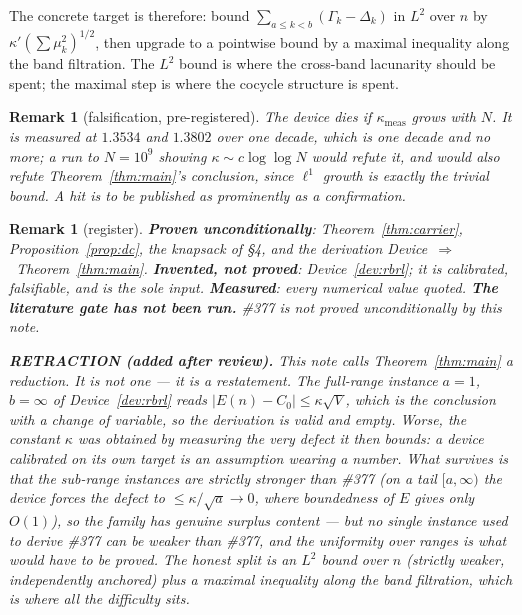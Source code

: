 \documentclass[11pt]{article}
\newtheorem{remark}[theorem]{Remark}
\begin{document}
The concrete target is therefore: bound
$\sum_{a\le k<b}(\Gamma_k-\Delta_k)$ in $L^2$ over $n$ by $\kappa'(\sum\mu_k^2)^{1/2}$,
then upgrade to a pointwise bound by a maximal inequality along the band
filtration.  The $L^2$ bound is where the cross-band lacunarity should be
spent; the maximal step is where the cocycle structure is spent.

\begin{remark}[falsification, pre-registered]
The device dies if $\kappa_{\mathrm{meas}}$ grows with $N$.  It is measured at
$1.3534$ and $1.3802$ over one decade, which is one decade and no more; a run to
$N=10^9$ showing $\kappa\sim c\log\log N$ would refute it, and would also refute
Theorem~\ref{thm:main}'s conclusion, since $\ell^1$ growth is exactly the
trivial bound.  A hit is to be published as prominently as a confirmation.
\end{remark}

\begin{remark}[register]
\textbf{Proven unconditionally}: Theorem~\ref{thm:carrier},
Proposition~\ref{prop:dc}, the knapsack of \S4, and the derivation
Device~$\Rightarrow$~Theorem~\ref{thm:main}.  \textbf{Invented, not proved}:
Device~\ref{dev:rbrl}; it is calibrated, falsifiable, and is the sole input.
\textbf{Measured}: every numerical value quoted.  \textbf{The literature gate has
not been run.}  \#377 is \emph{not} proved unconditionally by this note.

\medskip
\noindent\textbf{RETRACTION (added after review).}  This note calls
Theorem~\ref{thm:main} a \emph{reduction}.  It is not one --- it is a
\emph{restatement}.  The full-range instance $a=1$, $b=\infty$ of
Device~\ref{dev:rbrl} reads $|E(n)-C_0|\le\kappa\sqrt V$, which is the conclusion
with a change of variable, so the derivation is valid and empty.  Worse, the
constant $\kappa$ was obtained by measuring the very defect it then bounds: a
device calibrated on its own target is an assumption wearing a number.  What
survives is that the sub-range instances are strictly stronger than \#377 (on a
tail $[a,\infty)$ the device forces the defect to $\le\kappa/\sqrt a\to0$, where
boundedness of $E$ gives only $O(1)$), so the family has genuine surplus content
--- but no single instance used to derive \#377 can be weaker than \#377, and the
uniformity over ranges is what would have to be proved.  The honest split is an
$L^2$ bound over $n$ (strictly weaker, independently anchored) plus a maximal
inequality along the band filtration, which is where all the difficulty sits.
\end{remark}
\end{document}

